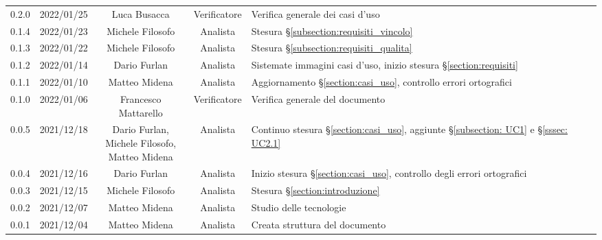 \begin{center}
\begin{longtable}[c]{c | c | c | c | p{5cm}}
		0.2.0 & 2022/01/25 & Luca Busacca & Verificatore & Verifica generale dei casi d'uso\\
		0.1.4 & 2022/01/23 & Michele Filosofo & Analista & Stesura §\ref{subsection:requisiti_vincolo}\\
		0.1.3 & 2022/01/22 & Michele Filosofo & Analista & Stesura §\ref{subsection:requisiti_qualita}\\
		0.1.2 & 2022/01/14 & Dario Furlan & Analista & Sistemate immagini casi d'uso, inizio stesura §\ref{section:requisiti}\\
		0.1.1 & 2022/01/10 & Matteo Midena & Analista & Aggiornamento §\ref{section:casi_uso}, controllo errori ortografici\\
		0.1.0 & 2022/01/06 & Francesco Mattarello & Verificatore & Verifica generale del documento\\
		0.0.5 & 2021/12/18 & \shortstack{Dario Furlan, \\ Michele Filosofo,\\ Matteo Midena} & Analista & Continuo stesura §\ref{section:casi_uso}, aggiunte §\ref{subsection: UC1}  e §\ref{sssec: UC2.1}\\
		0.0.4 & 2021/12/16 & Dario Furlan & Analista & Inizio stesura §\ref{section:casi_uso}, controllo degli errori ortografici\\
		0.0.3 & 2021/12/15 & Michele Filosofo & Analista & Stesura §\ref{section:introduzione}\\
		0.0.2 & 2021/12/07 & Matteo Midena & Analista & Studio delle tecnologie\\
		0.0.1 & 2021/12/04 & Matteo Midena& Analista & Creata struttura del documento\\
	\end{longtable}
\end{center}